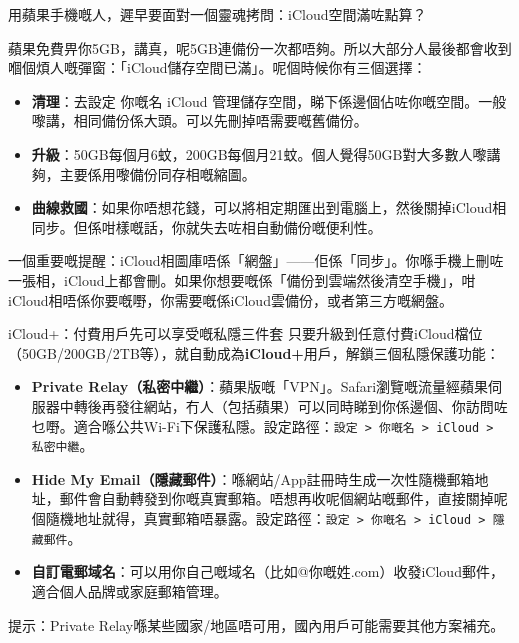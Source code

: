 用蘋果手機嘅人，遲早要面對一個靈魂拷問：iCloud空間滿咗點算？

蘋果免費畀你5GB，講真，呢5GB連備份一次都唔夠。所以大部分人最後都會收到嗰個煩人嘅彈窗：「iCloud儲存空間已滿」。呢個時候你有三個選擇：

\begin{itemize}
  \item \textbf{清理}：去設定 你嘅名 iCloud 管理儲存空間，睇下係邊個佔咗你嘅空間。一般嚟講，相同備份係大頭。可以先刪掉唔需要嘅舊備份。
  \item \textbf{升級}：50GB每個月6蚊，200GB每個月21蚊。個人覺得50GB對大多數人嚟講夠，主要係用嚟備份同存相嘅縮圖。
  \item \textbf{曲線救國}：如果你唔想花錢，可以將相定期匯出到電腦上，然後關掉iCloud相同步。但係咁樣嘅話，你就失去咗相自動備份嘅便利性。
\end{itemize}

一個重要嘅提醒：iCloud相圖庫唔係「網盤」——佢係「同步」。你喺手機上刪咗一張相，iCloud上都會刪。如果你想要嘅係「備份到雲端然後清空手機」，咁iCloud相唔係你要嘅嘢，你需要嘅係iCloud雲備份，或者第三方嘅網盤。

\begin{tcbinfo}{iCloud+：付費用戶先可以享受嘅私隱三件套}
只要升級到任意付費iCloud檔位（50GB/200GB/2TB等），就自動成為\textbf{iCloud+}用戶，解鎖三個私隱保護功能：

\begin{itemize}
  \item \textbf{Private Relay（私密中繼）}：蘋果版嘅「VPN」。Safari瀏覽嘅流量經蘋果伺服器中轉後再發往網站，冇人（包括蘋果）可以同時睇到你係邊個、你訪問咗乜嘢。適合喺公共Wi-Fi下保護私隱。設定路徑：\texttt{設定 > 你嘅名 > iCloud > 私密中繼}。
  \item \textbf{Hide My Email（隱藏郵件）}：喺網站/App註冊時生成一次性隨機郵箱地址，郵件會自動轉發到你嘅真實郵箱。唔想再收呢個網站嘅郵件，直接關掉呢個隨機地址就得，真實郵箱唔暴露。設定路徑：\texttt{設定 > 你嘅名 > iCloud > 隱藏郵件}。
  \item \textbf{自訂電郵域名}：可以用你自己嘅域名（比如@你嘅姓.com）收發iCloud郵件，適合個人品牌或家庭郵箱管理。
\end{itemize}

提示：Private Relay喺某些國家/地區唔可用，國內用戶可能需要其他方案補充。

\end{tcbinfo}


